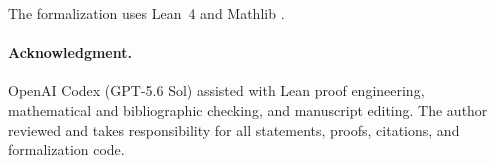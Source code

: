 \documentclass[11pt]{article}
\theoremstyle{remark}
\theoremstyle{definition}
\begin{document}
The formalization uses Lean~4 and Mathlib \cite{Lean4,Mathlib}.

\paragraph{Acknowledgment.}
OpenAI Codex (GPT-5.6 Sol) assisted with Lean proof engineering,
mathematical and bibliographic checking, and manuscript editing.  The
author reviewed and takes responsibility for all statements, proofs,
citations, and formalization code.



\end{document}
